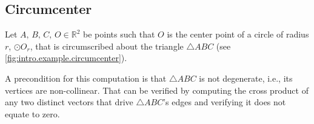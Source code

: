 \begin{comment}
We can determine if two lines are parallel by determining the angle $\theta$
between them, and verifying it is equal to $0$.
%
\begin{equation}\label{eq:angle.vectors.2}
  \theta = \arccos \frac{\vec{u} \cdot \vec{v}}%
                        {||\vec{u}|| \cdot ||\vec{v}||},~%
  \theta \in \mathbb{R}.
\end{equation}
%
Having $\vec{v} = \lambda \vec{u}, \lambda \in \mathbb{R}$, and knowing
%
\begin{equation}\label{eq:dot.vector.2.same}
  \vec{u} \cdot \vec{u} = ||\vec{u}||^2,
\end{equation}
%
then \eqref{eq:angle.vectors.2} becomes
%
\[
  \begin{split}
    \theta & = \arccos \frac{\vec{u} \cdot \lambda\vec{u}}%
                            {||\vec{u}|| \cdot ||\lambda\vec{u}||}\\%
           & = \arccos \frac{\lambda\vec{u} \cdot \vec{u}}%
                            {\lambda||\vec{u}||^2}\\%
           & = 0.
  \end{split}
\]
%
This means that we can compute a directional vector for $CS$ from the line $AB$,
where $\vec{u} = B - A$.  Finally, we can obtain the equation for the parallel
line $CS$
\end{comment}

\subsection{Circumcenter}%
\label{sec:intro.examples.circumcenter}

Let $A,\,B,\,C,\,O \in \mathbb{R}^2$ be points such that $O$ is the center point
of a circle of radius $r$, $\odot O_r$, that is circumscribed about the triangle
$\triangle ABC$ (see \cref{fig:intro.example.circumcenter}).

A precondition for this computation is that $\triangle ABC$ is not degenerate,
i.e., its vertices are non-collinear.  That can be verified by computing the
cross product of any two distinct vectors that drive $\triangle ABC$'s edges and
verifying it does not equate to zero.

